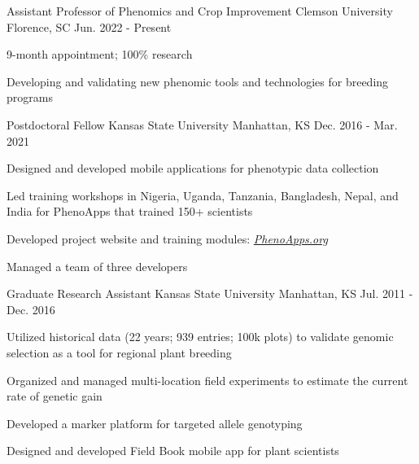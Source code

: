
\begin{cventries}

  \cventry
    {Assistant Professor of Phenomics and Crop Improvement} %
    {Clemson University} %
    {Florence, SC} %
    {Jun. 2022 - Present} %
    {
      \begin{cvitems} %
        \item {9-month appointment; 100\% research}
        \item {Developing and validating new phenomic tools and technologies for breeding programs}
      \end{cvitems}
    }

  \cventry
    {Postdoctoral Fellow} %
    {Kansas State University} %
    {Manhattan, KS} %
    {Dec. 2016 - Mar. 2021} %
    {
      \begin{cvitems} %
        \item {Designed and developed mobile applications for phenotypic data collection}
        \item {Led training workshops in Nigeria, Uganda, Tanzania, Bangladesh, Nepal, and India for PhenoApps that trained 150+ scientists}
        \item {Developed project website and training modules: \href{www.PhenoApps.org}{\textit{PhenoApps.org}}}
        \item {Managed a team of three developers}
      \end{cvitems}
    }

  \cventry
    {Graduate Research Assistant} %
    {Kansas State University} %
    {Manhattan, KS} %
    {Jul. 2011 - Dec. 2016} %
    {
      \begin{cvitems} %
        \item {Utilized historical data (22 years; 939 entries; 100k plots) to validate genomic selection as a  tool for regional plant breeding}
        \item {Organized and managed multi-location field experiments to estimate the current rate of genetic gain}
        \item {Developed a marker platform for targeted allele genotyping}
        \item {Designed and developed Field Book mobile app for plant scientists}
      \end{cvitems}
    }


\end{cventries}
